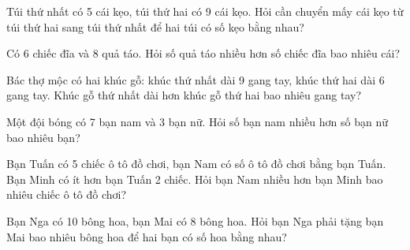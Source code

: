 \begin{ex}
Túi thứ nhất có 5 cái kẹo, túi thứ hai có 9 cái kẹo. Hỏi cần chuyển mấy cái kẹo từ túi thứ hai sang túi thứ nhất để hai túi có số kẹo bằng nhau?
\end{ex}

\begin{ex}
Có 6 chiếc đĩa và 8 quả táo. Hỏi số quả táo nhiều hơn số chiếc đĩa bao nhiêu cái?
\end{ex}

\begin{ex}
Bác thợ mộc có hai khúc gỗ: khúc thứ nhất dài 9 gang tay, khúc thứ hai dài 6 gang tay. Khúc gỗ thứ nhất dài hơn khúc gỗ thứ hai bao nhiêu gang tay?
\end{ex}

\begin{ex}
Một đội bóng có 7 bạn nam và 3 bạn nữ. Hỏi số bạn nam nhiều hơn số bạn nữ bao nhiêu bạn?
\end{ex}

\begin{ex}
Bạn Tuấn có 5 chiếc ô tô đồ chơi, bạn Nam có số ô tô đồ chơi bằng bạn Tuấn. Bạn Minh có ít hơn bạn Tuấn 2 chiếc. Hỏi bạn Nam nhiều hơn bạn Minh bao nhiêu chiếc ô tô đồ chơi?
\end{ex}

\begin{ex}
Bạn Nga có 10 bông hoa, bạn Mai có 8 bông hoa. Hỏi bạn Nga phải tặng bạn Mai bao nhiêu bông hoa để hai bạn có số hoa bằng nhau?
\end{ex}

